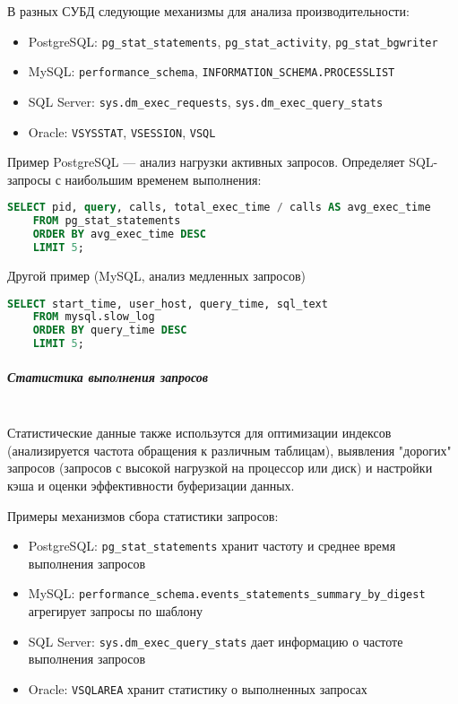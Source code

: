 В разных СУБД следующие механизмы для анализа производительности:
\begin{itemize}
    \item PostgreSQL: \texttt{pg\_stat\_statements}, \texttt{pg\_stat\_activity}, \texttt{pg\_stat\_bgwriter} \autocite[§27.2]{PostgreSQLdocc27}
    \item MySQL: \texttt{performance\_schema}, \texttt{INFORMATION\_SCHEMA.PROCESSLIST} \autocite{Mysqldoc2}
    \item SQL Server: \texttt{sys.dm\_exec\_requests}, \texttt{sys.dm\_exec\_query\_stats} \autocite{MicrosoftLearnSQLserverSysDymView}
    \item Oracle: \texttt{V\textdollar SYSSTAT}, \texttt{V\textdollar SESSION}, \texttt{V\textdollar SQL} \autocite[c. 9 §9.98, §9.17, §9.46]{oracledbdoc2}
\end{itemize}

Пример PostgreSQL — анализ нагрузки активных запросов. Определяет SQL-запросы с наибольшим временем выполнения:
\begin{lstlisting}[language=SQL]
    SELECT pid, query, calls, total_exec_time / calls AS avg_exec_time
    FROM pg_stat_statements
    ORDER BY avg_exec_time DESC
    LIMIT 5;        
\end{lstlisting}

Другой пример (MySQL, анализ медленных запросов)
\begin{lstlisting}[language=SQL]
    SELECT start_time, user_host, query_time, sql_text
    FROM mysql.slow_log
    ORDER BY query_time DESC
    LIMIT 5;        
\end{lstlisting}

\subparagraph{Статистика выполнения запросов} ~\\

Статистические данные также использутся для оптимизации индексов (анализируется частота обращения к различным таблицам), выявления "дорогих" запросов (запросов с высокой нагрузкой на процессор или диск) и настройки кэша и оценки эффективности буферизации данных.

Примеры механизмов сбора статистики запросов:
\begin{itemize}
    \item PostgreSQL: \texttt{pg\_stat\_statements} хранит частоту и среднее время выполнения запросов
    \item MySQL: \texttt{performance\_schema.events\_statements\_summary\_by\_digest} агрегирует запросы по шаблону
    \item SQL Server: \texttt{sys.dm\_exec\_query\_stats} дает информацию о частоте выполнения запросов
    \item Oracle: \texttt{V\textdollar SQLAREA} хранит статистику о выполненных запросах
\end{itemize}


